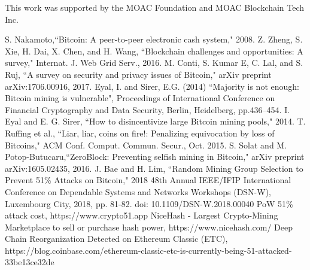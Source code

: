\documentclass[conference]{IEEEtran}
\begin{document}
This work was supported by the MOAC Foundation and MOAC Blockchain Tech Inc.

\begin{thebibliography}{00}

 S. Nakamoto,``Bitcoin: A peer-to-peer electronic cash system," 2008.
 Z. Zheng, S. Xie, H. Dai, X. Chen, and H. Wang, ``Blockchain challenges
and opportunities: A survey," Internat. J. Web Grid Serv., 2016.
M. Conti, S. Kumar E, C. Lal, and S. Ruj, ``A survey on security and privacy issues of Bitcoin," arXiv preprint arXiv:1706.00916, 2017.
 Eyal, I. and Sirer, E.G. (2014) ``Majority is not enough: Bitcoin mining is vulnerable", Proceedings
of International Conference on Financial Cryptography and Data Security, Berlin, Heidelberg,
pp.436–454.
 I. Eyal and E. G. Sirer, ``How to disincentivize large Bitcoin mining pools," 2014.
 T. Ruffing et al., “Liar, liar, coins on fire!: Penalizing equivocation by loss of Bitcoins," ACM Conf. Comput. Commun. Secur., Oct. 2015.
 S. Solat and M. Potop-Butucaru,``ZeroBlock: Preventing selfish mining in Bitcoin," arXiv preprint arXiv:1605.02435, 2016.
 J. Bae and H. Lim, ``Random Mining Group Selection to Prevent 51\% Attacks on Bitcoin," 2018 48th Annual IEEE/IFIP International Conference on Dependable Systems and Networks Workshops (DSN-W), Luxembourg City, 2018, pp. 81-82. 
doi: 10.1109/DSN-W.2018.00040
 PoW 51\% attack cost, https://www.crypto51.app
 NiceHash - Largest Crypto-Mining Marketplace to sell or purchase hash power, https://www.nicehash.com/
 Deep Chain Reorganization Detected on Ethereum Classic (ETC), https://blog.coinbase.com/ethereum-classic-etc-is-currently-being-51-attacked-33be13ce32de

\end{thebibliography}
\vspace{12pt}
\color{red}
\end{document}
